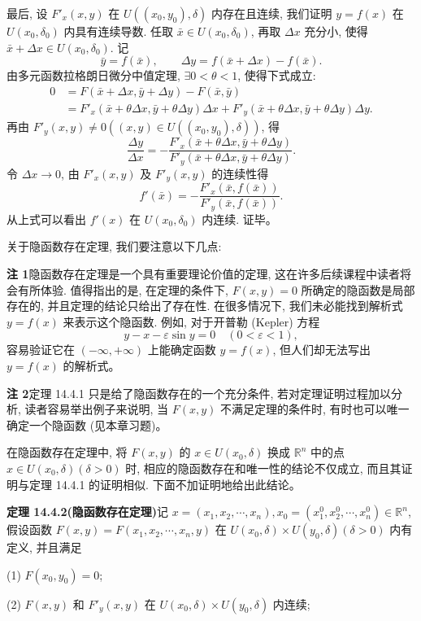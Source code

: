 \documentclass[UTF8, 12pt, fontset=fandol, oneside]{ctexart}
\begin{document}
最后, 设 $F'_x(x,y)$ 在 $U((x_0,y_0),\delta)$ 内存在且连续, 我们证明 $y=f(x)$ 在 $U(x_0,\delta_0)$ 内具有连续导数. 任取 $\bar x\in U(x_0,\delta_0)$, 再取 $\Delta x$ 充分小, 使得 $\bar x+\Delta x\in U(x_0,\delta_0)$. 记
\[
  \bar y=f(\bar x),\qquad
  \Delta y=f(\bar x+\Delta x)-f(\bar x).
\]
由多元函数拉格朗日微分中值定理, $\exists0<\theta<1$, 使得下式成立:
\[
\begin{aligned}
  0&=F(\bar x+\Delta x,\bar y+\Delta y)-F(\bar x,\bar y)\\
  &=F'_x(\bar x+\theta\Delta x,\bar y+\theta\Delta y)\Delta x
  +F'_y(\bar x+\theta\Delta x,\bar y+\theta\Delta y)\Delta y.
\end{aligned}
\]
再由 $F'_y(x,y)\ne0((x,y)\in U((x_0,y_0),\delta))$, 得
\[
  \frac{\Delta y}{\Delta x}
  =-\frac{F'_x(\bar x+\theta\Delta x,\bar y+\theta\Delta y)}
  {F'_y(\bar x+\theta\Delta x,\bar y+\theta\Delta y)}.
\]
令 $\Delta x\to0$, 由 $F'_x(x,y)$ 及 $F'_y(x,y)$ 的连续性得
\[
  f'(\bar x)=-\frac{F'_x(\bar x,f(\bar x))}{F'_y(\bar x,f(\bar x))}.
\]
从上式可以看出 $f'(x)$ 在 $U(x_0,\delta_0)$ 内连续. 证毕。

关于隐函数存在定理, 我们要注意以下几点:

\noindent\textbf{注 1}\quad 隐函数存在定理是一个具有重要理论价值的定理, 这在许多后续课程中读者将会有所体验. 值得指出的是, 在定理的条件下, $F(x,y)=0$ 所确定的隐函数是局部存在的, 并且定理的结论只给出了存在性. 在很多情况下, 我们未必能找到解析式 $y=f(x)$ 来表示这个隐函数. 例如, 对于开普勒 (Kepler) 方程
\[
  y-x-\varepsilon\sin y=0\quad(0<\varepsilon<1),
\]
容易验证它在 $(-\infty,+\infty)$ 上能确定函数 $y=f(x)$, 但人们却无法写出 $y=f(x)$ 的解析式。

\noindent\textbf{注 2}\quad 定理 14.4.1 只是给了隐函数存在的一个充分条件, 若对定理证明过程加以分析, 读者容易举出例子来说明, 当 $F(x,y)$ 不满足定理的条件时, 有时也可以唯一确定一个隐函数 (见本章习题)。

在隐函数存在定理中, 将 $F(x,y)$ 的 $x\in U(x_0,\delta)$ 换成 $\mathbb R^n$ 中的点 $x\in U(x_0,\delta)(\delta>0)$ 时, 相应的隐函数存在和唯一性的结论不仅成立, 而且其证明与定理 14.4.1 的证明相似. 下面不加证明地给出此结论。

\noindent\textbf{定理 14.4.2(隐函数存在定理)}\quad 记 $x=(x_1,x_2,\cdots,x_n),x_0=(x_1^0,x_2^0,\cdots,x_n^0)\in\mathbb R^n$, 假设函数 $F(x,y)=F(x_1,x_2,\cdots,x_n,y)$ 在 $U(x_0,\delta)\times U(y_0,\delta)(\delta>0)$ 内有定义, 并且满足

(1) $F(x_0,y_0)=0$;

(2) $F(x,y)$ 和 $F'_y(x,y)$ 在 $U(x_0,\delta)\times U(y_0,\delta)$ 内连续;
\end{document}
